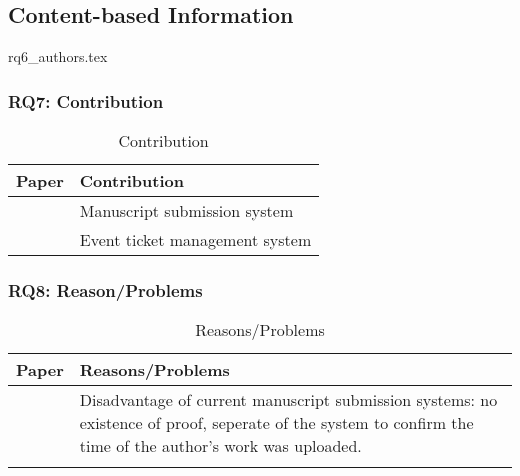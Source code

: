 
\subsection{Content-based Information}
\label{subsec:ContentBasedInformation}

{rq6_authors.tex}

\clearpage
\subsubsection{RQ7: Contribution}

\begin{longtable}{ |c|p{6cm}| }
	\caption{Contribution} \\
	\hline
 	\textbf{Paper} & \textbf{Contribution} \\ [0.5ex] 
 	\hline\hline
 	\endhead
 	\cite{2017_Gipp} & Manuscript submission system\\
	\hline
	\cite{2017_Tackmann} & Event ticket management system \\
	\hline
\end{longtable}

\clearpage
\subsubsection{RQ8: Reason/Problems}

\begin{longtable}{ |c|p{6cm}| }
	\caption{Reasons/Problems}
	\label{tab:rq8_reason_problem}\\
	\hline
 	\textbf{Paper} & \textbf{Reasons/Problems} \\ [0.5ex] 
 	\hline\hline
 	\endhead
 	\cite{2017_Gipp} & Disadvantage of current manuscript submission systems: no existence of proof, seperate of the system to confirm the time of the author's work was uploaded.\\
	\hline
	\cite{2017_Tackmann} & \\
	\hline
\end{longtable}

\clearpage
